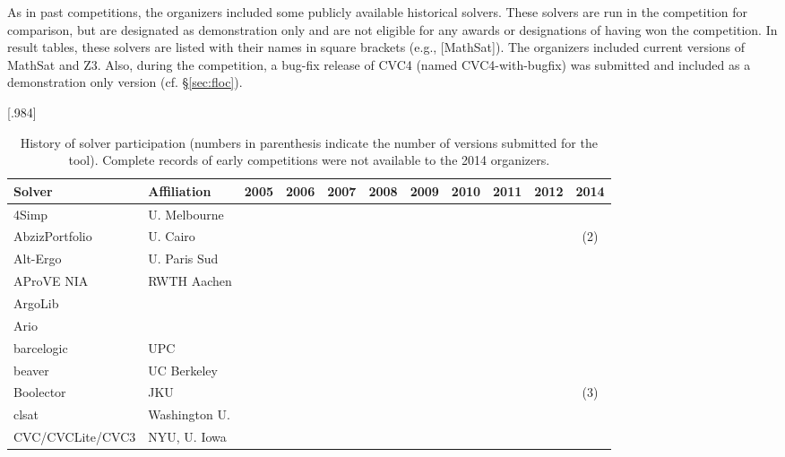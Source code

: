 \documentclass[twoside,11pt]{article}
\begin{document}
As in past competitions, the organizers included some publicly available historical solvers. These solvers are run in the competition for comparison, but are designated as demonstration only and are not eligible for any awards or designations of having won the competition. In result tables, these solvers are listed with their names in square brackets (e.g., [MathSat]). The organizers included current versions of MathSat and Z3. Also, during the competition, a bug-fix release of CVC4 (named CVC4-with-bugfix) was submitted and included as a demonstration only version (cf. \S\ref{sec:floc}).



\begin{table}[H]
\caption{History of solver participation (numbers in parenthesis indicate
  the number of versions submitted for the tool). Complete records of early competitions were not available to the 2014 organizers.}
\label{Table:participants}
\renewcommand{\mark}[0]{\ding{51}}
\centering
\setlength{\tabcolsep}{1pt}
\scalebox{1}[.984]{\begin{tabular}{|l@{\,\,}l|c|c|c|c|c|c|c|c|c|}
\hline
Solver & Affiliation & 2005 & 2006 & 2007 & 2008 & 2009 & 2010 & 2011 & 2012 & 2014 \\
\hline
4Simp                  & U. Melbourne 	&   &   &   &   &   &   &   &   & \mark  \\
AbzizPortfolio         & U. Cairo       &   &   &   &   &   &   &   & \mark & (2)\\
Alt-Ergo               & U. Paris Sud  &   &   &   & \mark &   &   &   &  &   \\
AProVE NIA             & RWTH Aachen    &   &   &   &   &   & \mark & \mark &   & \mark \\
ArgoLib                &   &   &   & \mark &   &   &   &   &  &   \\
Ario                   &   & \mark & \mark &   &   &   &   &   &  &   \\
barcelogic             & UPC            & \mark & \mark & \mark & \mark & \mark &   &   &   &   \\
beaver                 & UC Berkeley   &   &   &   & \mark & \mark &   &   &   &   \\
Boolector              & JKU            &   &   &   & \mark & \mark &   & \mark & \mark & (3)\\
clsat                  & Washington U.  &   &   &   & \mark & \mark &   &   &   &   \\
CVC/CVCLite/CVC3       & NYU, U. Iowa   & \mark & \mark & \mark & \mark & \mark & \mark & \mark & \mark & \mark \\

\end{tabular}}
\end{table}
\end{document}
